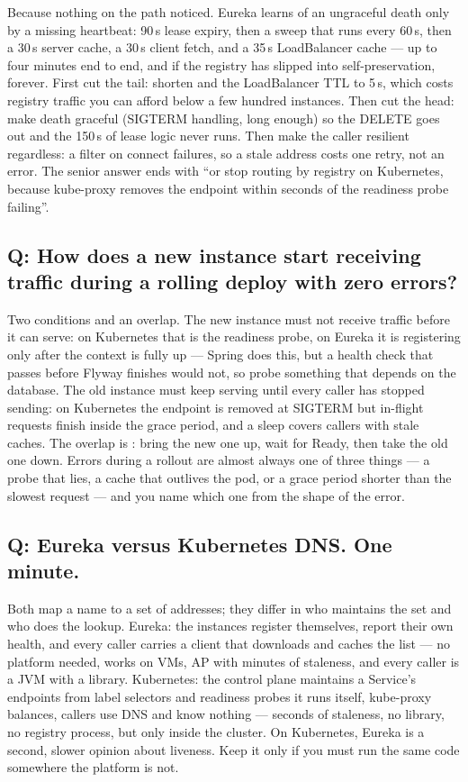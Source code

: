 Because nothing on the path noticed. Eureka learns of an ungraceful
death only by a missing heartbeat: 90\,s lease expiry, then a sweep that
runs every 60\,s, then a 30\,s server cache, a 30\,s client fetch, and a
35\,s LoadBalancer cache --- up to four minutes end to end, and if the
registry has slipped into self-preservation, forever. First cut the
tail: shorten  and the
LoadBalancer TTL to 5\,s, which costs registry traffic you can afford
below a few hundred instances. Then cut the head: make death graceful
(SIGTERM handling,  long enough) so
the DELETE goes out and the 150\,s of lease logic never runs. Then make
the caller resilient regardless: a  filter on connect
failures, so a stale address costs one retry, not an error. The senior
answer ends with ``or stop routing by registry on Kubernetes, because
kube-proxy removes the endpoint within seconds of the readiness probe
failing''.

\subsection*{Q: How does a new instance start receiving traffic during a
rolling deploy with zero errors?}

Two conditions and an overlap. The new instance must not receive
traffic before it can serve: on Kubernetes that is the readiness
probe, on Eureka it is registering only after the context is fully up
--- Spring does this, but a health check that passes before Flyway
finishes would not, so probe something that depends on the database.
The old instance must keep serving until every caller has stopped
sending: on Kubernetes the endpoint is removed at SIGTERM but in-flight
requests finish inside the grace period, and a  sleep
covers callers with stale caches. The overlap is
: bring the new one up, wait for
Ready, then take the old one down. Errors during a rollout are almost
always one of three things --- a probe that lies, a cache that
outlives the pod, or a grace period shorter than the slowest request
--- and you name which one from the shape of the error.

\subsection*{Q: Eureka versus Kubernetes DNS. One minute.}

Both map a name to a set of addresses; they differ in who maintains the
set and who does the lookup. Eureka: the instances register themselves,
report their own health, and every caller carries a client that
downloads and caches the list --- no platform needed, works on VMs,
AP with minutes of staleness, and every caller is a JVM with a
library. Kubernetes: the control plane maintains a Service's endpoints
from label selectors and readiness probes it runs itself, kube-proxy
balances, callers use DNS and know nothing --- seconds of staleness,
no library, no registry process, but only inside the cluster. On
Kubernetes, Eureka is a second, slower opinion about liveness. Keep it
only if you must run the same code somewhere the platform is not.

